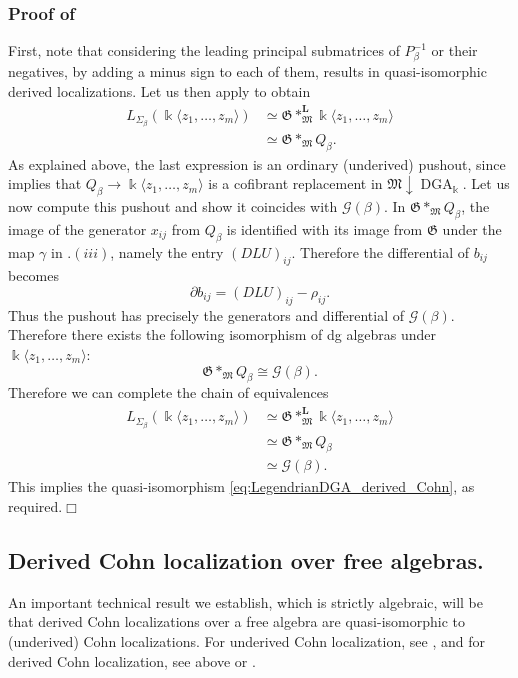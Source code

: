 \documentclass[11pt]{article}
\newcommand{\kk}{\Bbbk}
\newcommand{\FM}{\mathfrak M}
\newcommand{\FG}{\mathfrak G}
\newcommand{\cG}{\mathcal G}
\newcommand{\DGA}{\operatorname{DGA}_{\kk}}
\begin{document}
\subsubsection{Proof of }
First, note that considering the leading principal submatrices of $P_\beta^{-1}$ or their negatives, by adding a minus sign to each of them, results in quasi-isomorphic derived localizations. Let us then apply  to obtain
\begin{align*}
 L_{\Sigma_\beta}(\kk\langle z_1,\ldots,z_m\rangle)
 &\simeq \FG*^{\mathbf L}_{\FM}\kk\langle z_1,\ldots,z_m\rangle\\
 &\simeq \FG*_{\FM}Q_\beta.
\end{align*}
As explained above, the last expression is an ordinary (underived) pushout, since  implies that \(Q_\beta\to \kk\langle z_1,\ldots,z_m\rangle\) is a
cofibrant replacement in \(\FM\!\downarrow\!\DGA\). Let us now compute this pushout and show it coincides with $\cG(\beta)$.  In \(\FG*_{\FM}Q_\beta\), the image of the generator
\(x_{ij}\) from \(Q_\beta\) is identified with its image from \(\FG\) under the map $\gamma$ in .$(iii)$,
namely the entry \((DLU)_{ij}\).  Therefore the differential of \(b_{ij}\) becomes
\[
 \partial b_{ij}=(DLU)_{ij}-\rho_{ij}.
\]
Thus the pushout has
precisely the generators and differential of \(\cG(\beta)\). Therefore there
exists the following isomorphism of dg algebras under \(\kk\langle z_1,\ldots,z_m\rangle\):
\[
 \FG*_{\FM}Q_\beta\cong\cG(\beta).
\]
Therefore we can complete the chain of equivalences
\begin{align*}
 L_{\Sigma_\beta}(\kk\langle z_1,\ldots,z_m\rangle)
 &\simeq \FG*^{\mathbf L}_{\FM}\kk\langle z_1,\ldots,z_m\rangle\\
 &\simeq \FG*_{\FM}Q_\beta\\
  &\simeq \cG(\beta).
\end{align*}
This implies the quasi-isomorphism \eqref{eq:LegendrianDGA_derived_Cohn}, as required.\hfill$\Box$

\subsection{ Derived Cohn localization over free algebras.}\label{ssec:derived_Cohn_underived} An important technical result we establish, which is strictly algebraic, will be that derived Cohn localizations over a free algebra are quasi-isomorphic to (underived) Cohn localizations. For underived Cohn localization, see \cite[Chapter 7]{CohnBook}, and for derived Cohn localization, see  above or \cite[Section 4.3]{BCL}.\\
\end{document}
